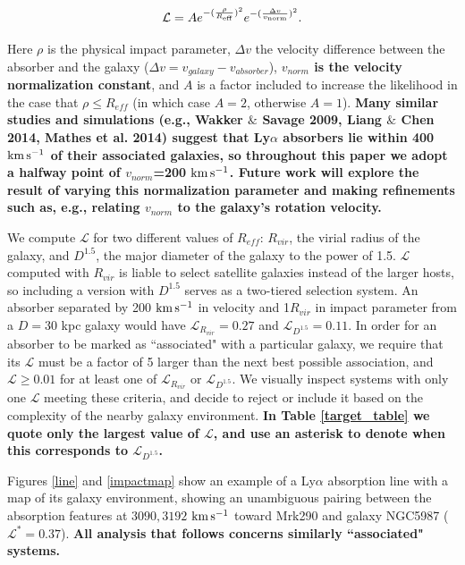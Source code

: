 \documentclass[twocolumn,tighten]{aastex6}
\begin{document}
\begin{equation}
	\mathcal{L} = A e^{-(\frac{\rho}{R_{\rm eff}})^2} e^{-(\frac{\Delta v}{v_{\rm norm}})^2}.
\end{equation}

\noindent Here $\rho$ is the physical impact parameter, $\Delta v$ the velocity difference between the absorber and the galaxy ($\Delta v = v_{galaxy} - v_{absorber}$), \textbf{$v_{norm}$ is the velocity normalization constant}, and $A$ is a factor included to increase the likelihood in the case that $\rho \leq R_{eff}$ (in which case $A = 2$, otherwise $A = 1$). \textbf{Many similar studies and simulations (e.g., Wakker $\&$ Savage 2009, Liang $\&$ Chen 2014, Mathes et al. 2014) suggest that Ly$\alpha$ absorbers lie within 400 $\rm km\, s^{-1}$ of their associated galaxies, so throughout this paper we adopt a halfway point of $v_{norm}$=200 $\rm km\, s^{-1}$. Future work will explore the result of varying this normalization parameter and making refinements such as, e.g., relating $v_{norm}$ to the galaxy's rotation velocity.}

We compute $\mathcal{L}$ for two different values of $R_{eff}$: $R_{vir}$, the virial radius of the galaxy, and $D^{1.5}$, the major diameter of the galaxy to the power of 1.5. $\mathcal{L}$ computed with $R_{vir}$ is liable to select satellite galaxies instead of the larger hosts, so including a version with $D^{1.5}$ serves as a two-tiered selection system. An absorber separated by 200 $\rm km\, s^{-1}$ in velocity and 1$R_{vir}$ in impact parameter from a $D=30$ kpc galaxy would have $\mathcal{L}_{R_{vir}} = 0.27$ and $\mathcal{L}_{D^{1.5}} = 0.11$. In order for an absorber to be marked as ``associated" with a particular galaxy, we require that its $\mathcal{L}$ must be a factor of 5 larger than the next best possible association, and $\mathcal{L} \ge 0.01$ for at least one of $\mathcal{L}_{R_{vir}}$ or $\mathcal{L}_{D^{1.5}}$. We visually inspect systems with only one $\mathcal{L}$ meeting these criteria, and decide to reject or include it based on the complexity of the nearby galaxy environment. \textbf{In Table \ref{target_table} we quote only the largest value of $\mathcal{L}$, and use an asterisk to denote when this corresponds to $\mathcal{L}_{D^{1.5}}$.}

Figures \ref{line} and \ref{impactmap} show an example of a Ly$\alpha$ absorption line with a map of its galaxy environment, showing an unambiguous pairing between the absorption features at $3090, 3192$ $\rm km\, s^{-1}$ toward Mrk290 and galaxy NGC5987 ($\mathcal{L}^* = 0.37$). \textbf{All analysis that follows concerns similarly ``associated" systems.}
\end{document}
